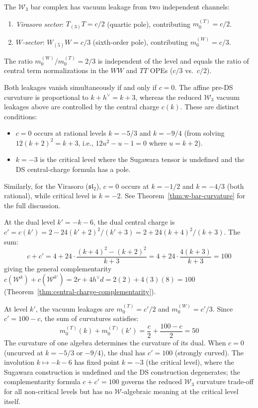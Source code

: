 \begin{computation}
The $\mathcal{W}_3$ bar complex has vacuum leakage from two independent channels:
\begin{enumerate}
\item \emph{Virasoro sector}: $T_{(3)}T = c/2$ (quartic pole), contributing $m_0^{(T)} = c/2$.
\item \emph{$W$-sector}: $W_{(5)}W = c/3$ (sixth-order pole), contributing $m_0^{(W)} = c/3$.
\end{enumerate}
The ratio $m_0^{(W)}/m_0^{(T)} = 2/3$ is independent of the level and equals the
ratio of central term normalizations in the $WW$ and $TT$ OPEs
($c/3$ vs.\ $c/2$).

Both leakages vanish simultaneously if and only if $c = 0$.
The affine pre-DS curvature is proportional to $k+h^\vee=k+3$,
whereas the reduced $\mathcal{W}_3$ vacuum leakages above are
controlled by the central charge $c(k)$. These are distinct
conditions:
\begin{itemize}
\item $c = 0$ occurs at rational levels $k = -5/3$ and $k = -9/4$
 (from solving $12(k+2)^2 = k+3$, i.e., $12u^2 - u - 1 = 0$ where $u = k+2$).
\item $k = -3$ is the critical level where the Sugawara tensor is undefined and
 the DS central-charge formula has a pole.
\end{itemize}
Similarly, for the Virasoro ($\mathfrak{sl}_2$), $c = 0$ occurs at
$k = -1/2$ and $k = -4/3$ (both rational), while critical level is $k = -2$.
See Theorem~\ref{thm:w-bar-curvature} for the full discussion.

At the dual level $k' = -k-6$, the dual central charge is $c' = c(k') = 2 - 24(k'+2)^2/(k'+3) = 2 + 24(k+4)^2/(k+3)$.
The sum:
\[
c + c' = 4 + 24\cdot\frac{(k+4)^2 - (k+2)^2}{k+3}
 = 4 + 24\cdot\frac{4(k+3)}{k+3} = 100
\]
giving the general complementarity $c(\mathcal{W}^k) + c(\mathcal{W}^{k'})
= 2r + 4h^\vee d = 2(2) + 4(3)(8) = 100$
(Theorem~\ref{thm:central-charge-complementarity}).

At level $k'$, the vacuum leakages are $m_0^{(T)} = c'/2$ and $m_0^{(W)} = c'/3$.
Since $c' = 100 - c$, the sum of curvatures satisfies:
\[
m_0^{(T)}(k) + m_0^{(T)}(k') = \frac{c}{2} + \frac{100-c}{2} = 50
\]
The curvature of one algebra determines the curvature of its dual. When
$c = 0$ (uncurved at $k = -5/3$ or $-9/4$), the dual has $c' = 100$
(strongly curved). The involution $k \mapsto -k-6$ has fixed point $k = -3$
(the critical level), where the Sugawara construction is undefined and the DS construction degenerates;
the complementarity formula $c + c' = 100$ governs the reduced
$\mathcal{W}_3$ curvature trade-off for all non-critical levels but
has no $\mathcal{W}$-algebraic meaning at the critical level itself.


\end{computation}
